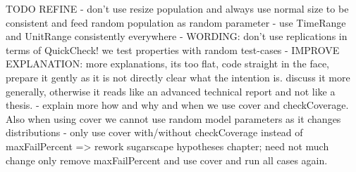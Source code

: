 TODO REFINE
- don't use resize population and always use normal size to be consistent and feed random population as random parameter
- use TimeRange and UnitRange consistently everywhere
- WORDING: don't use replications in terms of QuickCheck! we test properties with random test-cases
- IMPROVE EXPLANATION: more explanations, its too flat, code straight in the face, prepare it gently as it is not directly clear what the intention is. discuss it more generally, otherwise it reads like an advanced technical report and not like a thesis.
- explain more how and why and when we use cover and checkCoverage. Also when using cover we cannot use random model parameters as it changes distributions
- only use cover with/without checkCoverage instead of maxFailPercent => rework sugarscape hypotheses chapter; need not much change only remove maxFailPercent and use cover and run all cases again.

\bigskip

















